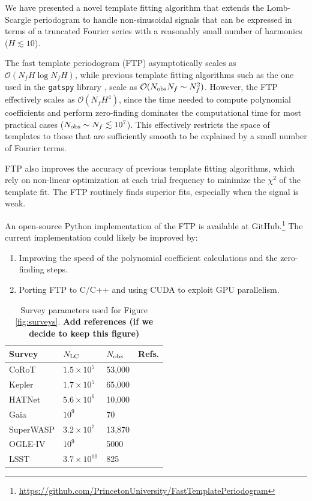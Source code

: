 \documentclass[apj]{emulateapj}
\newcommand{\todo}[1]{{\bf #1}}
\newcommand{\bigO}{\mathcal{O}}
\begin{document}
We have presented a novel template fitting algorithm that extends
the Lomb-Scargle periodogram \citep{Lomb_1976,Scargle_1982,Barning_1963,Vanicek_1971}
to handle non-sinusoidal signals that can be expressed in terms of
a truncated Fourier series with a reasonably small number of harmonics
($H\lesssim 10$). 

The fast template periodogram (FTP) asymptotically scales as 
$\bigO(N_fH\log N_fH)$, while previous template fitting algorithms
such as the one used in the \texttt{gatspy} library \citep{gatspy},
scale as $\bigO(N_{\rm obs}N_f\sim N_f^2)$. However, the FTP effectively
scales as $\bigO(N_fH^4)$, since the time needed to compute polynomial
coefficients and perform zero-finding dominates the computational time
for most practical cases ($N_{\rm obs}\sim N_f \lesssim 10^7$).
This effectively restricts the space of templates to those that are
sufficiently smooth to be explained by a small number of Fourier terms.

FTP also improves the accuracy of previous template fitting algorithms, 
which rely on non-linear optimization at each trial frequency to minimize
the $\chi^2$ of the template fit. The FTP routinely finds superior fits,
especially when the signal is weak.

An open-source Python implementation of the FTP is available at
GitHub.\footnote{\url{https://github.com/PrincetonUniversity/FastTemplatePeriodogram}} 
The current implementation could likely be improved by:

\begin{enumerate}
    \item Improving the speed of the polynomial
          coefficient calculations and the zero-finding steps.
    \item Porting FTP to C/C++ and using CUDA to exploit GPU parallelism.
\end{enumerate}

\begin{table}
\centering
\begin{tabular}{l|l|l|l}
Survey     & $N_{\rm LC}$ & $N_{\rm obs}$ & Refs. \\
\hline\hline
CoRoT      & $1.5\times 10^5$  &  53,000       &       \\
\hline
Kepler     & $1.7\times 10^5$  &  65,000       &       \\
\hline
HATNet     & $5.6\times 10^6$  &  10,000       &       \\
\hline
Gaia       &           $10^9$  &  70           &       \\
\hline
SuperWASP  & $3.2\times 10^7$  &  13,870       &       \\
\hline
OGLE-IV    &           $10^9$  &  5000         &       \\
\hline
LSST       & $3.7\times 10^{10}$ &  825          &       \\
\hline
\end{tabular}
\caption{\label{tab:surveypars} Survey parameters used for Figure \ref{fig:surveys}.
\todo{Add references (if we decide to keep this figure)}}
\end{table}
\end{document}
